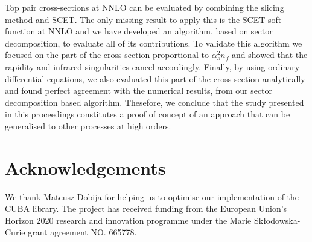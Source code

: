 \documentclass{appolb}
\begin{document}
Top pair cross-sections at NNLO can be evaluated by combining the
slicing method and SCET. The only missing result to apply this is the SCET soft function at NNLO  and we have 
developed an algorithm, based on sector decomposition, to evaluate all of its contributions.
 To validate this algorithm we focused on the part of the cross-section proportional to $\alpha_s^2 n_f$ and showed that the rapidity and infrared singularities cancel accordingly. Finally, by using ordinary differential equations, 
we also evaluated this part of the cross-section analytically and found 
perfect agreement with the numerical results, from our sector decomposition based algorithm. Thesefore, we conclude that the study presented in this proceedings constitutes a proof of concept of an approach that can be generalised to other processes at high orders. 


\section*{Acknowledgements}

We thank Mateusz Dobija for helping us to optimise our implementation of the CUBA library.  The project has received funding from the European Union's Horizon 2020
research  and  innovation  programme  under  the  Marie  Sk\l{}odowska-Curie
grant agreement NO. 665778.


\FloatBarrier

\begin{thebibliography}{99}

   \end{thebibliography}
\end{document}
